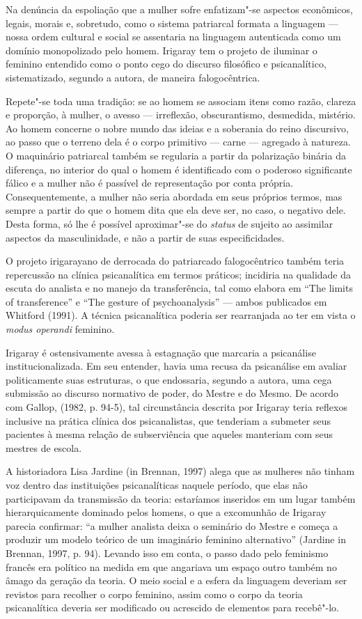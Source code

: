 Na denúncia da espoliação que a mulher sofre enfatizam"-se aspectos
econômicos, legais, morais e, sobretudo, como o sistema patriarcal
formata a linguagem --- nossa ordem cultural e social se assentaria na
linguagem autenticada como um domínio monopolizado pelo homem. Irigaray
tem o projeto de iluminar o feminino entendido como o ponto cego do
discurso filosófico e psicanalítico, sistematizado, segundo a autora, de
maneira falogocêntrica.

Repete"-se toda uma tradição: se ao homem se associam itens como razão,
clareza e proporção, à mulher, o avesso --- irreflexão, obscurantismo,
desmedida, mistério. Ao homem concerne o nobre mundo das ideias e a
soberania do reino discursivo, ao passo que o terreno dela é o corpo
primitivo --- carne --- agregado à natureza. O maquinário patriarcal
também se regularia a partir da polarização binária da diferença, no
interior do qual o homem é identificado com o poderoso significante
fálico e a mulher não é passível de representação por conta própria.
Consequentemente, a mulher não seria abordada em seus próprios termos,
mas sempre a partir do que o homem dita que ela deve ser, no caso, o
negativo dele. Desta forma, só lhe é possível aproximar"-se do
\emph{status} de sujeito ao assimilar aspectos da masculinidade, e não a
partir de suas especificidades.

O projeto irigarayano de derrocada do patriarcado falogocêntrico também
teria repercussão na clínica psicanalítica em termos práticos; incidiria
na qualidade da escuta do analista e no manejo da transferência, tal
como elabora em ``The limits of transference'' e ``The gesture of
psychoanalysis'' --- ambos publicados em Whitford (1991). A técnica
psicanalítica poderia ser rearranjada ao ter em vista o \emph{modus
operandi} feminino.

Irigaray é ostensivamente avessa à estagnação que marcaria a psicanálise
institucionalizada. Em seu entender, havia uma recusa da psicanálise em
avaliar politicamente suas estruturas, o que endossaria, segundo a
autora, uma cega submissão ao discurso normativo de poder, do Mestre e
do Mesmo. De acordo com Gallop, (1982, p. 94-5), tal circunstância
descrita por Irigaray teria reflexos inclusive na prática clínica dos
psicanalistas, que tenderiam a submeter seus pacientes à mesma relação
de subserviência que aqueles manteriam com seus mestres de escola.

A historiadora Lisa Jardine (in Brennan, 1997) alega que as mulheres não
tinham voz dentro das instituições psicanalíticas naquele período, que
elas não participavam da transmissão da teoria: estaríamos inseridos em
um lugar também hierarquicamente dominado pelos homens, o que a
excomunhão de Irigaray parecia confirmar: ``a mulher analista deixa o
seminário do Mestre e começa a produzir um modelo teórico de um
imaginário feminino alternativo'' (Jardine in Brennan, 1997, p. 94).
Levando isso em conta, o passo dado pelo feminismo francês era político
na medida em que angariava um espaço outro também no âmago da geração da
teoria. O meio social e a esfera da linguagem deveriam ser revistos para
recolher o corpo feminino, assim como o corpo da teoria psicanalítica
deveria ser modificado ou acrescido de elementos para recebê"-lo.

